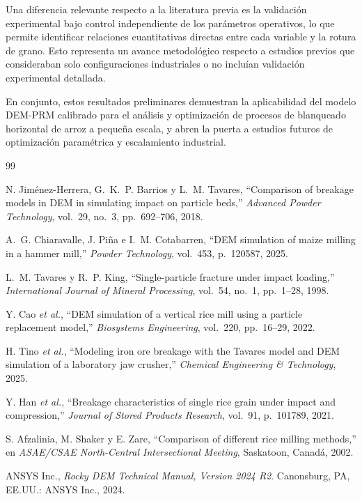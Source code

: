 \documentclass[conference]{IEEEtran}
\begin{document}
Una diferencia relevante respecto a la literatura previa es la validación experimental bajo control independiente de los parámetros operativos, lo que permite identificar relaciones cuantitativas directas entre cada variable y la rotura de grano. Esto representa un avance metodológico respecto a estudios previos que consideraban solo configuraciones industriales o no incluían validación experimental detallada.

En conjunto, estos resultados preliminares demuestran la aplicabilidad del modelo DEM-PRM calibrado para el análisis y optimización de procesos de blanqueado horizontal de arroz a pequeña escala, y abren la puerta a estudios futuros de optimización paramétrica y escalamiento industrial.
\begin{thebibliography}{99}

N. Jiménez-Herrera, G.~K.~P. Barrios y L.~M. Tavares, ``Comparison of breakage models in DEM in simulating impact on particle beds,'' \textit{Advanced Powder Technology}, vol.~29, no.~3, pp.~692--706, 2018.

A.~G. Chiaravalle, J. Piña e I.~M. Cotabarren, ``DEM simulation of maize milling in a hammer mill,'' \textit{Powder Technology}, vol.~453, p.~120587, 2025.

L.~M. Tavares y R.~P. King, ``Single-particle fracture under impact loading,'' \textit{International Journal of Mineral Processing}, vol.~54, no.~1, pp.~1--28, 1998.

Y. Cao \textit{et al.}, ``DEM simulation of a vertical rice mill using a particle replacement model,'' \textit{Biosystems Engineering}, vol.~220, pp.~16--29, 2022.

H. Tino \textit{et al.}, ``Modeling iron ore breakage with the Tavares model and DEM simulation of a laboratory jaw crusher,'' \textit{Chemical Engineering \& Technology}, 2025.

Y. Han \textit{et al.}, ``Breakage characteristics of single rice grain under impact and compression,'' \textit{Journal of Stored Products Research}, vol.~91, p.~101789, 2021.

S. Afzalinia, M. Shaker y E. Zare, ``Comparison of different rice milling methods,'' en \textit{ASAE/CSAE North-Central Intersectional Meeting}, Saskatoon, Canadá, 2002.

ANSYS Inc., \textit{Rocky DEM Technical Manual, Version 2024 R2}. Canonsburg, PA, EE.UU.: ANSYS Inc., 2024.

\end{thebibliography}
\end{document}
